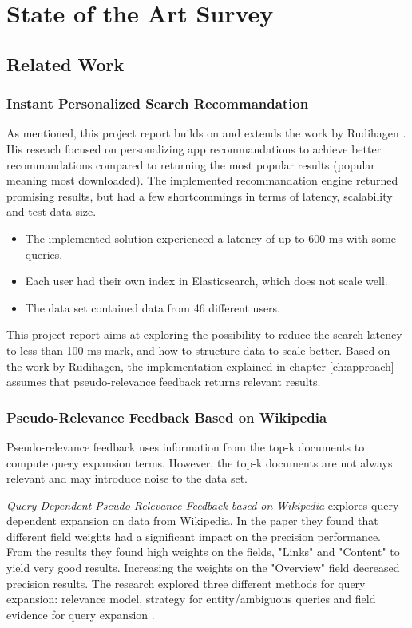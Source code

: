 \chapter{State of the Art Survey}
\label{ch:related-work}

\section{Related Work}

\subsection{Instant Personalized Search Recommandation}
As mentioned, this project report builds on and extends the work by Rudihagen \cite{master-thesis}.
His reseach focused on personalizing app recommandations to achieve better recommandations compared to returning the most popular results (popular meaning most downloaded).
The implemented recommandation engine returned promising results, but had a few shortcommings in terms of latency, scalability and test data size.

\begin{itemize}
  \item The implemented solution experienced a latency of up to 600 ms with some queries.
  \item Each user had their own index in Elasticsearch, which does not scale well.
  \item The data set contained data from 46 different users.
\end{itemize}

This project report aims at exploring the possibility to reduce the search latency to less than 100 ms mark, and how to structure data to scale better.
Based on the work by Rudihagen,
the implementation explained in chapter \ref{ch:approach} assumes that pseudo-relevance feedback returns relevant results.

\subsection{Pseudo-Relevance Feedback Based on Wikipedia}
Pseudo-relevance feedback uses information from the top-k documents to compute query expansion terms.
However, the top-k documents are not always relevant and may introduce noise to the data set.

\textit{Query Dependent Pseudo-Relevance Feedback based on Wikipedia} explores query dependent expansion on data from Wikipedia.
In the paper they found that different field weights had a significant impact on the precision performance.
From the results they found high weights on the fields, "Links" and "Content" to yield very good results.
Increasing the weights on the "Overview" field decreased precision results.
The research explored three different methods for query expansion:
relevance model, strategy for entity/ambiguous queries and field evidence for query expansion \cite{pseudo-relevance-wikipedia}.

